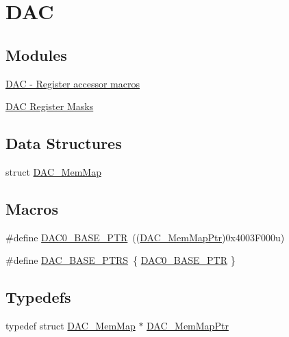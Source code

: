 \hypertarget{group___d_a_c___peripheral}{}\section{D\+A\+C}
\label{group___d_a_c___peripheral}
\subsection*{Modules}
\begin{DoxyCompactItemize}
\item 
\hyperlink{group___d_a_c___register___accessor___macros}{D\+A\+C -\/ Register accessor macros}
\item 
\hyperlink{group___d_a_c___register___masks}{D\+A\+C Register Masks}
\end{DoxyCompactItemize}
\subsection*{Data Structures}
\begin{DoxyCompactItemize}
\item 
struct \hyperlink{struct_d_a_c___mem_map}{D\+A\+C\+\_\+\+Mem\+Map}
\end{DoxyCompactItemize}
\subsection*{Macros}
\begin{DoxyCompactItemize}
\item 
\#define \hyperlink{group___d_a_c___peripheral_gabe3b30df06ec04e5c899efd6e49f1800}{D\+A\+C0\+\_\+\+B\+A\+S\+E\+\_\+\+P\+T\+R}~((\hyperlink{group___d_a_c___peripheral_gaf4fffbe25ce148c577ec740897223a7f}{D\+A\+C\+\_\+\+Mem\+Map\+Ptr})0x4003\+F000u)
\item 
\#define \hyperlink{group___d_a_c___peripheral_gab47690040e4d63adc4f324358c27157a}{D\+A\+C\+\_\+\+B\+A\+S\+E\+\_\+\+P\+T\+R\+S}~\{ \hyperlink{group___d_a_c___peripheral_gabe3b30df06ec04e5c899efd6e49f1800}{D\+A\+C0\+\_\+\+B\+A\+S\+E\+\_\+\+P\+T\+R} \}
\end{DoxyCompactItemize}
\subsection*{Typedefs}
\begin{DoxyCompactItemize}
\item 
typedef struct \hyperlink{struct_d_a_c___mem_map}{D\+A\+C\+\_\+\+Mem\+Map} $\ast$ \hyperlink{group___d_a_c___peripheral_gaf4fffbe25ce148c577ec740897223a7f}{D\+A\+C\+\_\+\+Mem\+Map\+Ptr}
\end{DoxyCompactItemize}


